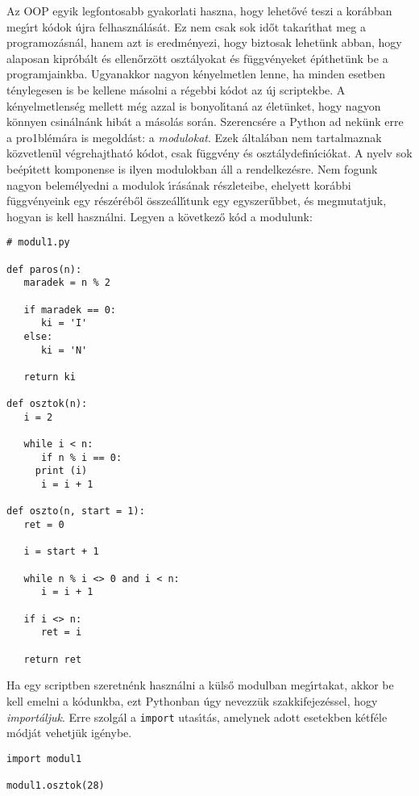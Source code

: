 Az OOP egyik legfontosabb gyakorlati haszna, hogy lehet\H{o}v\'e teszi a kor\'abban meg\'{\i}rt k\'odok \'ujra 
felhaszn\'al\'as\'at. Ez nem csak sok id\H{o}t takar\'{\i}that meg a programoz\'asn\'al, hanem azt is eredm\'enyezi, 
hogy biztosak lehet\"unk abban, hogy alaposan kipr\'ob\'alt \'es ellen\H{o}rz\"ott oszt\'alyokat \'es f\"uggv\'enyeket 
\'ep\'{\i}thet\"unk be a programjainkba. Ugyanakkor nagyon k\'enyelmetlen lenne, ha minden esetben t\'enylegesen is be 
kellene m\'asolni a r\'egebbi k\'odot az \'uj scriptekbe. A k\'enyelmetlens\'eg mellett m\'eg azzal is bonyol\'{\i}tan\'a 
az \'elet\"unket, hogy nagyon k\"onnyen csin\'aln\'ank hib\'at a m\'asol\'as sor\'an. Szerencs\'ere a Python ad nek\"unk 
erre a pro1bl\'em\'ara is megold\'ast: a {\sl modulokat}. Ezek \'altal\'aban nem tartalmaznak k\"ozvetlen\"ul 
v\'egrehajthat\'o k\'odot, csak f\"uggv\'eny \'es oszt\'alydefin\'{\i}ci\'okat. A nyelv sok be\'ep\'{\i}tett komponense 
is ilyen modulokban \'all a rendelkez\'esre. Nem fogunk nagyon belem\'elyedni a modulok \'{\i}r\'as\'anak r\'eszleteibe, 
ehelyett kor\'abbi f\"uggv\'enyeink egy r\'esz\'er\'eb\H{o}l \"ossze\'all\'{\i}tunk egy egyszer\H{u}bbet, \'es megmutatjuk, 
hogyan is kell haszn\'alni. Legyen a k\"ovetkez\H{o} k\'od a modulunk:

\begin{Verbatim}[fontsize=\small]
# modul1.py

def paros(n):
   maradek = n % 2

   if maradek == 0:
      ki = 'I'
   else:
      ki = 'N'

   return ki

def osztok(n):
   i = 2

   while i < n:
      if n % i == 0:
	 print (i)
      i = i + 1

def oszto(n, start = 1):
   ret = 0

   i = start + 1

   while n % i <> 0 and i < n:
      i = i + 1

   if i <> n:
      ret = i

   return ret
\end{Verbatim}

Ha egy scriptben szeretn\'enk haszn\'alni a k\"uls\H{o} modulban meg\'{\i}rtakat, akkor be kell emelni a k\'odunkba, ezt 
Pythonban \'ugy nevezz\"uk szakkifejez\'essel, hogy {\sl import\'aljuk}. Erre szolg\'al a {\tt import} utas\'{\i}t\'as, 
amelynek adott esetekben k\'etf\'ele m\'odj\'at vehetj\"uk ig\'enybe.

\begin{Verbatim}[fontsize=\small]
import modul1

modul1.osztok(28)
\end{Verbatim}


